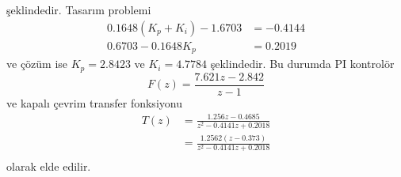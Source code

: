 şeklindedir. Tasarım problemi
\begin{equation}
    \begin{split}
       0.1648(K_p+K_i)-1.6703&=-0.4144\\
       0.6703-0.1648K_p&=0.2019
    \end{split}
\end{equation}
ve çözüm ise $K_p=2.8423$ ve $K_i=4.7784$ şeklindedir. Bu durumda PI kontrolör
\begin{equation}
        F(z)=\frac{7.621 z - 2.842}{z-1}
\end{equation}
ve kapalı çevrim transfer fonksiyonu
\begin{equation}
\begin{split}
    T(z)&=\frac{1.256 z - 0.4685}{z^2 - 0.4141 z + 0.2018}\\
    &=\frac{1.2562 (z-0.373)}{z^2 - 0.4141 z + 0.2018}\\
\end{split}
\end{equation}
olarak elde edilir.